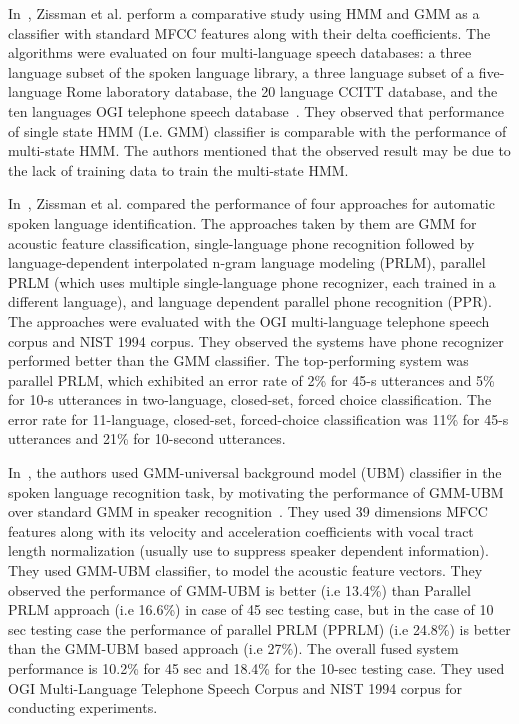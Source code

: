\begin{spacing}{1.5}
In~\cite{zissman1993automatic}, Zissman et al. perform a comparative study using HMM and GMM as a classifier with standard MFCC features along with their delta coefficients. The algorithms were evaluated on four multi-language speech databases: a three language subset of the spoken language library, a three language subset of a five-language Rome laboratory database, the 20 language CCITT database, and the ten languages OGI telephone
speech database~\cite{muthusamy1992ogi}. They observed that performance of single state HMM (I.e. GMM) classifier is comparable with the performance of multi-state HMM. The authors mentioned that the observed result may be due to the lack of training data to train the multi-state HMM. 

In~\cite{zissman1996comparison}, Zissman et al. compared the performance of four approaches for automatic spoken language identification. The approaches taken by them are  GMM for acoustic feature classification, single-language phone recognition followed by language-dependent interpolated n-gram language modeling (PRLM), parallel PRLM (which uses multiple single-language phone recognizer, each trained in a different language), and language dependent parallel phone recognition (PPR). The approaches were evaluated with the OGI multi-language telephone speech corpus and NIST 1994 corpus. They observed the systems have phone recognizer performed better than the GMM classifier. The top-performing system was parallel PRLM, which exhibited an error rate of 2\% for 45-s utterances and 5\% for 10-s utterances in two-language, closed-set, forced choice
classification. The error rate for 11-language, closed-set, forced-choice classification was 11\% for 45-s utterances and 21\% for 10-second utterances.

In~\cite{wong2002methods}, the authors used GMM-universal background model (UBM) classifier in the spoken language recognition task, by motivating the performance of GMM-UBM over standard GMM in speaker recognition~\cite{reynolds2000speaker}. They used 39 dimensions MFCC features along with its velocity and acceleration coefficients with vocal tract length normalization (usually use to suppress speaker dependent information). They used GMM-UBM classifier, to model the acoustic feature vectors. They observed the performance of GMM-UBM is better (i.e 13.4\%) than Parallel PRLM approach (i.e 16.6\%) in case of 45 sec testing case, but in the case of 10 sec testing case the performance of parallel PRLM (PPRLM) (i.e 24.8\%) is better than the GMM-UBM based approach (i.e 27\%). The overall fused system performance is 10.2\% for 45 sec and 18.4\% for the 10-sec testing case. They used OGI Multi-Language Telephone Speech Corpus and NIST 1994 corpus for conducting experiments.


\end{spacing}
